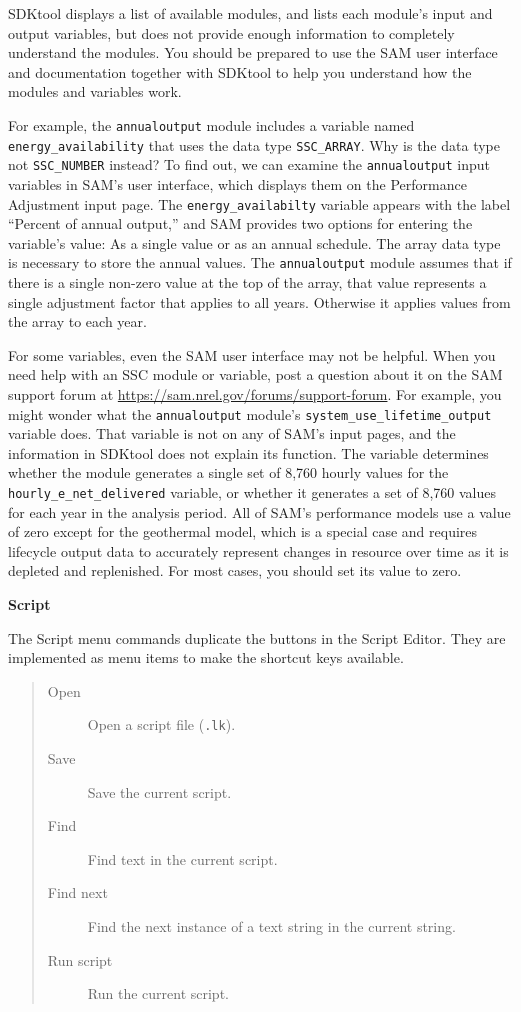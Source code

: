 \documentclass{scrartcl} %
\begin{document}
SDKtool displays a list of available modules, and lists each module's input and output variables, but does not provide enough information to completely understand the modules. You should be prepared to use the SAM user interface and documentation together with SDKtool to help you understand how the modules and variables work. 

For example, the \texttt{annualoutput} module includes a variable named \texttt{energy\_availability} that uses the data type \texttt{SSC\_ARRAY}. Why is the data type not \texttt{SSC\_NUMBER} instead? To find out, we can examine the \texttt{annualoutput} input variables in SAM's user interface, which displays them on the Performance Adjustment input page. The \texttt{energy\_availabilty} variable appears with the label ``Percent of annual output,'' and SAM provides two options for entering the variable's value: As a single value or as an annual schedule. The array data type is necessary to store the annual values. The \texttt{annualoutput} module assumes that if there is a single non-zero value at the top of the array, that value represents a single adjustment factor that applies to all years. Otherwise it applies values from the array to each year.

For some variables, even the SAM user interface may not be helpful. When you need help with an SSC module or variable, post a question about it on the SAM support forum at \url{https://sam.nrel.gov/forums/support-forum}. For example, you might wonder what the \texttt{annualoutput} module's \texttt{system\_use\_lifetime\_output} variable does. That variable is not on any of SAM's input pages, and the information in SDKtool does not explain its function. The variable determines whether the module generates a single set of 8,760 hourly values for the \texttt{hourly\_e\_net\_delivered} variable, or whether it generates a set of 8,760 values for each year in the analysis period. All of SAM's performance models use a value of zero except for the geothermal model, which is a special case and requires lifecycle output data to accurately represent changes in resource over time as it is depleted and replenished. For most cases, you should set its value to zero.

\textbf{Script}

The Script menu commands duplicate the buttons in the Script Editor. They are implemented as menu items to make the shortcut keys available.

\begin{quote}
\begin{description}
\item[Open] Open a script file (\texttt{.lk}).
\item[Save] Save the current script.
\item[Find] Find text in the current script.
\item[Find next] Find the next instance of a text string in the current string.
\item[Run script] Run the current script. 
\end{description}
\end{quote}
\end{document}
